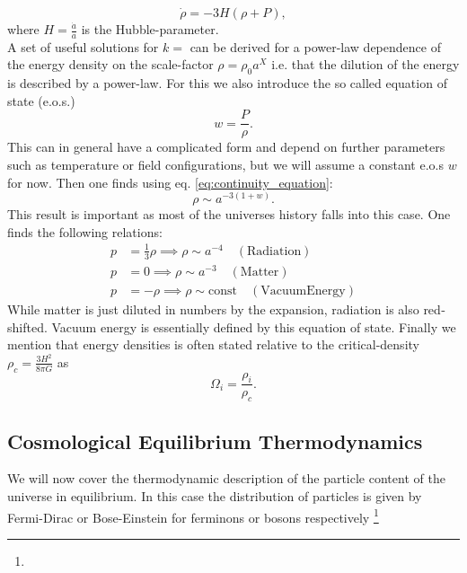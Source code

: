 \documentclass[master,       %
               twoside,        %
               BCOR10mm,       %
               english,ngerman, %
               ]{GAUBM}
\begin{document}
\begin{otherlanguage}{english}
\begin{equation}
	\label{eq:continuity_equation}
	\dot{\rho} = - 3 H (\rho + P),
\end{equation}
where $H = \frac{\dot{a}}{a}$ is the Hubble-parameter. \\
\noindent A set of useful solutions for $k = $ can be derived for a power-law dependence of the energy density on the scale-factor $\rho = \rho_0 a^X$ i.e. that the dilution of the energy is described by a power-law. For this we also introduce the so called equation of state (e.o.s.)
\begin{equation}
	w = \frac{P}{\rho}.
\end{equation}
This can in general have a complicated form and depend on further parameters such as temperature or field configurations, but we will assume a constant e.o.s $w$ for now.
Then one finds using eq. \eqref{eq:continuity_equation}:
\begin{equation}
	\rho \sim a^{-3(1 + w)}.
\end{equation}
This result is important as most of the universes history falls into this case.
One finds the following relations:
\begin{align}
	p &= \frac{1}{3} \rho \implies \rho \sim a^{-4} \quad \mathrm{(Radiation)} \nonumber \\
	p &= 0 \implies \rho \sim a^{-3} \quad \mathrm{(Matter)} \nonumber \\
	p &= - \rho \implies \rho \sim \mathrm{const} \quad \mathrm{(Vacuum Energy)}
\end{align}
While matter is just diluted in numbers by the expansion, radiation is also redshifted.
Vacuum energy is essentially defined by this equation of state.
Finally we mention that energy densities is often stated relative to the critical-density $\rho_c = \frac{3 H^2}{8 \pi G}$ as
\begin{equation}
	\Omega_i = \frac{\rho_i}{\rho_c}.
\end{equation}

\subsection{Cosmological Equilibrium Thermodynamics}
We will now cover the thermodynamic description of the particle content of the universe
in equilibrium.
In this case the distribution of particles is given by Fermi-Dirac or Bose-Einstein for ferminons or bosons respectively \footnote{

}
\end{otherlanguage}
\end{document}
